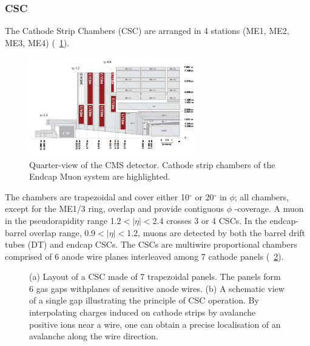 \subsubsection{CSC}
The Cathode Strip Chambers (CSC) are arranged in 4 stations (ME1, ME2, ME3, ME4) (\figurename~\ref{CSC}). 
\begin{figure}[h!]
 \centering
 \includegraphics[width=0.65\textwidth]{Images/CSC}
 \caption{Quarter-view of the CMS detector. Cathode strip chambers of the Endcap Muon system are highlighted.}
\label{CSC}
\end{figure}
The chambers are trapezoidal and cover either 10$^\circ$ or 20$^\circ$ in $\phi$; all chambers, except for the ME1/3 ring, overlap and provide contiguous $\phi$ -coverage. A muon in the pseudorapidity range 1.2$<|\eta|<$2.4 crosses 3 or 4 CSCs. In the endcap-barrel overlap range, 0.9$<|\eta|<$1.2, muons are detected by both the barrel drift tubes (DT) and endcap CSCs. 
The CSCs are multiwire proportional chambers comprised of 6 anode wire planes interleaved among 7 cathode panels (\figurename~\ref{CSC_chamber}). 
\begin{figure}[htbp]
	\centering
	 \quad
	\caption{ (a) Layout of a CSC made of 7 trapezoidal panels. The panels form 6 gas gaps withplanes of sensitive anode wires. (b) A schematic view of a single gap illustrating the principle of CSC operation. By interpolating charges induced on cathode strips by avalanche positive ions near a wire, one can obtain a precise localisation of an avalanche along the wire direction.}
\label{CSC_chamber}
\end{figure}
